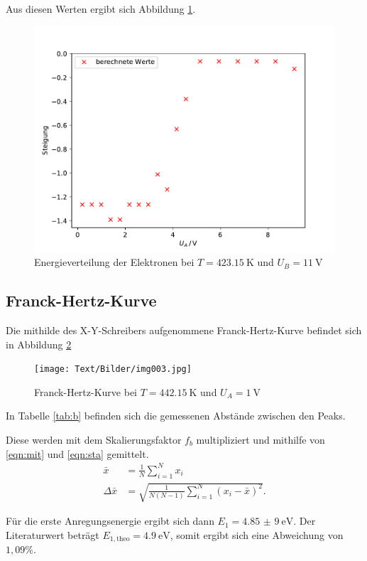 Aus diesen Werten ergibt sich Abbildung \ref{fig:a22}.
\begin{figure}[H]
  \centering
  \includegraphics[width=.9\textwidth]{Plots/a2.pdf}
  \caption{Energieverteilung der Elektronen bei $T = \SI{423,15}{\K}$ und $U_B = \SI{11}{\V}$}
  \label{fig:a22}
\end{figure}

\subsection{Franck-Hertz-Kurve}
Die mithilde des X-Y-Schreibers aufgenommene Franck-Hertz-Kurve befindet sich in Abbildung \ref{fig:b}
\begin{figure}[H]
  \centering
  \texttt{[image: Text/Bilder/img003.jpg]}
  \caption{Franck-Hertz-Kurve bei $T = \SI{442,15}{\K}$ und $U_A = \SI{1}{\V}$}
  \label{fig:b}
\end{figure}

In Tabelle \ref{tab:b} befinden sich die gemessenen Abstände zwischen den Peaks.


Diese werden mit dem Skalierungsfaktor $f_b$ multipliziert und mithilfe von \eqref{eqn:mit} und \eqref{eqn:sta} gemittelt.
\begin{align}
  \bar{x} &= \frac{1}{N} \sum_{i=1}^{N} x_i
  \label{eqn:mit} \\
  \Delta \bar{x} &= \sqrt{\frac{1}{N (N - 1)} \sum_{i=1}^{N} (x_i - \bar{x})^2}.
  \label{eqn:sta}
\end{align}

Für die erste Anregungsenergie ergibt sich dann $E_1 = \SI{4,85(9)}{\eV}$.
Der Literaturwert \cite{sample2} beträgt $E_{1, \text{theo}} = \SI{4,9}{\eV}$, somit ergibt sich eine Abweichung von $1,09 \%$.

